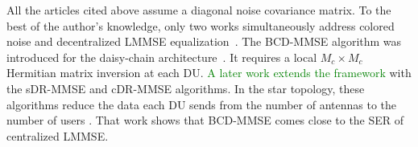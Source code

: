 All the articles cited above assume a diagonal noise covariance matrix.
To the best of the author's knowledge, only two works simultaneously address colored noise and
decentralized LMMSE equalization~\cite{zhao2021-globecom,zhao2025jsac}. The BCD-MMSE algorithm was introduced for the daisy-chain architecture~\cite{zhao2021-globecom}. It requires a local $M_c \times M_c$ Hermitian matrix inversion
at each DU. \textcolor{GREEN}{A later work extends the framework} with the sDR-MMSE and cDR-MMSE algorithms. In the star topology, these algorithms reduce the data each DU sends from the number of antennas to the number of users \cite{zhao2025jsac}. That work shows that BCD-MMSE comes close to the SER of centralized LMMSE.

